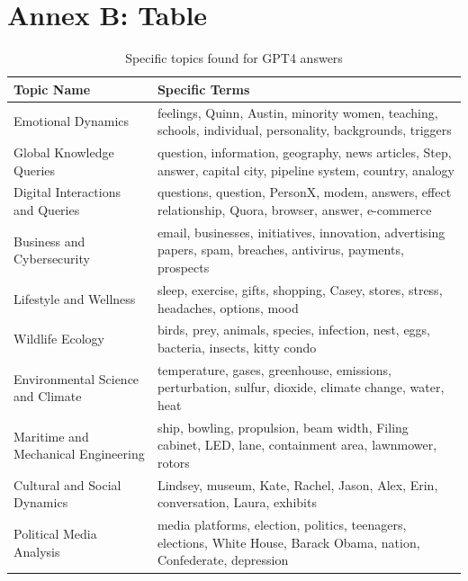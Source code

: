 \documentclass{article}
\begin{document}
\FloatBarrier %


\section*{Annex B: Table}
\begin{table}[ht]
  \caption{Specific topics found for GPT4 answers}
  \label{sample-table}
  \centering
  \begin{tabular}{|m{6cm}|m{9cm}|}
    \hline
    \textbf{Topic Name}                   & \textbf{Specific Terms}                                      \\ \hline
    Emotional Dynamics                    & feelings, Quinn, Austin, minority women, teaching, schools, individual, personality, backgrounds, triggers      \\ \hline
    Global Knowledge Queries              & question, information, geography, news articles, Step, answer, capital city, pipeline system, country, analogy \\ \hline
    Digital Interactions and Queries      & questions, question, PersonX, modem, answers, effect relationship, Quora, browser, answer, e-commerce           \\ \hline
    Business and Cybersecurity            & email, businesses, initiatives, innovation, advertising papers, spam, breaches, antivirus, payments, prospects \\ \hline
    Lifestyle and Wellness                & sleep, exercise, gifts, shopping, Casey, stores, stress, headaches, options, mood                                   \\ \hline
    Wildlife Ecology                      & birds, prey, animals, species, infection, nest, eggs, bacteria, insects, kitty condo                                \\ \hline
    Environmental Science and Climate     & temperature, gases, greenhouse, emissions, perturbation, sulfur, dioxide, climate change, water, heat               \\ \hline
    Maritime and Mechanical Engineering   & ship, bowling, propulsion, beam width, Filing cabinet, LED, lane, containment area, lawnmower, rotors               \\ \hline
    Cultural and Social Dynamics         & Lindsey, museum, Kate, Rachel, Jason, Alex, Erin, conversation, Laura, exhibits                                        \\ \hline
    Political Media Analysis             & media platforms, election, politics, teenagers, elections, White House, Barack Obama, nation, Confederate, depression \\ \hline

\end{tabular}
\end{table}
\end{document}
